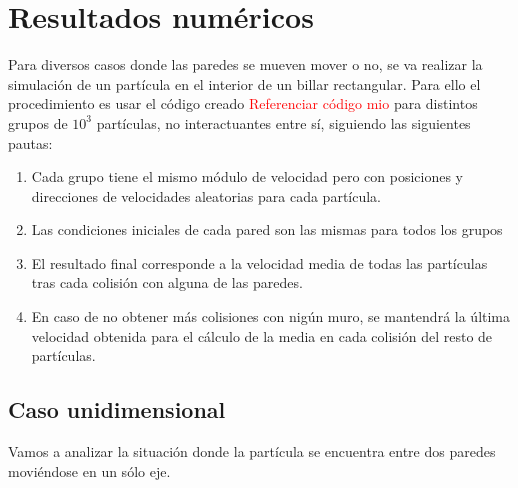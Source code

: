 \documentclass[11pt, spanish]{book}
\begin{document}
\chapter{Resultados numéricos}

Para diversos casos donde las paredes se mueven mover o no, se va realizar la simulación de un partícula en el interior de un billar rectangular. Para ello el procedimiento es usar el código creado \textcolor{red}{Referenciar código mio} para distintos grupos de \( 10^3 \) partículas, no interactuantes entre sí, siguiendo las siguientes pautas:

\begin{enumerate}
    \item Cada grupo tiene el mismo módulo de velocidad pero con posiciones y direcciones de velocidades aleatorias para cada partícula.
    \item Las condiciones iniciales de cada pared son las mismas para todos los grupos
    \item El resultado final corresponde a la velocidad media de todas las partículas tras cada colisión con alguna de las paredes.
    \item En caso de no obtener más colisiones con nigún muro, se mantendrá la última velocidad obtenida para el cálculo de la media en cada colisión del resto de partículas.
\end{enumerate}

\section{Caso unidimensional}

Vamos a analizar la situación donde la partícula se encuentra entre dos paredes moviéndose en un sólo eje.
\end{document}
